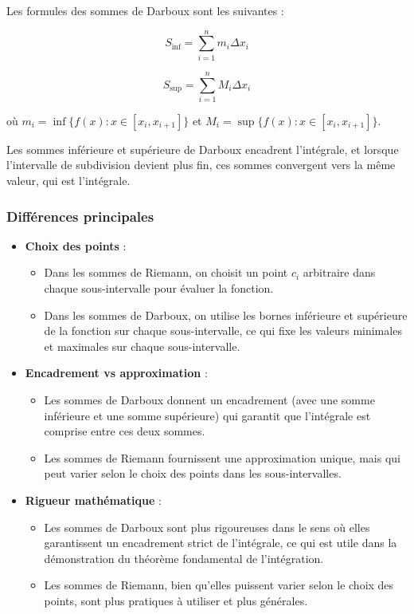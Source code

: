 Les formules des sommes de Darboux sont les suivantes :

\[
S_{\text{inf}} = \sum_{i=1}^{n} m_i \Delta x_i
\]

\[
S_{\text{sup}} = \sum_{i=1}^{n} M_i \Delta x_i
\]

où $m_i = \inf\{f(x) : x \in [x_i, x_{i+1}]\}$ et $M_i = \sup\{f(x) : x \in [x_i, x_{i+1}]\}$.

Les sommes inférieure et supérieure de Darboux encadrent l'intégrale, et lorsque l'intervalle de subdivision devient plus fin, ces sommes convergent vers la même valeur, qui est l'intégrale.

\subsubsection{Différences principales}

\begin{itemize}
    \item \textbf{Choix des points} :
    \begin{itemize}
        \item Dans les sommes de Riemann, on choisit un point $c_i$ arbitraire dans chaque sous-intervalle pour évaluer la fonction.
        \item Dans les sommes de Darboux, on utilise les bornes inférieure et supérieure de la fonction sur chaque sous-intervalle, ce qui fixe les valeurs minimales et maximales sur chaque sous-intervalle.
    \end{itemize}

    \item \textbf{Encadrement vs approximation} :
    \begin{itemize}
        \item Les sommes de Darboux donnent un encadrement (avec une somme inférieure et une somme supérieure) qui garantit que l'intégrale est comprise entre ces deux sommes.
        \item Les sommes de Riemann fournissent une approximation unique, mais qui peut varier selon le choix des points dans les sous-intervalles.
    \end{itemize}

    \item \textbf{Rigueur mathématique} :
    \begin{itemize}
        \item Les sommes de Darboux sont plus rigoureuses dans le sens où elles garantissent un encadrement strict de l'intégrale, ce qui est utile dans la démonstration du théorème fondamental de l'intégration.
        \item Les sommes de Riemann, bien qu'elles puissent varier selon le choix des points, sont plus pratiques à utiliser et plus générales.
    \end{itemize}
\end{itemize}

